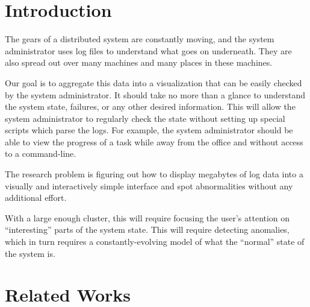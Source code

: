\documentclass[conference]{style/acmsiggraph}
\begin{document}
\TOGlinkslist


\copyrightspace

\section{Introduction}

The gears of a distributed system are constantly moving, and the system administrator uses log files
to understand what goes on underneath. They are also spread out over many machines and many places in
these machines.

Our goal is to aggregate this data into a visualization that can be easily checked by the system
administrator. It should take no more than a glance to understand the system state, failures, or any
other desired information. This will allow the system administrator to regularly check the state
without setting up special scripts which parse the logs. For example, the system administrator
should be able to view the progress of a task while away from the office and without access to a
command-line.

The research problem is figuring out how to display megabytes of log data into a visually and
interactively simple interface and spot abnormalities without any additional effort.

With a large enough cluster, this will require focusing the user’s attention on “interesting” parts
of the system state. This will require detecting anomalies, which in turn requires a
constantly-evolving model of what the “normal” state of the system is.


\section{Related Works}
\end{document}
